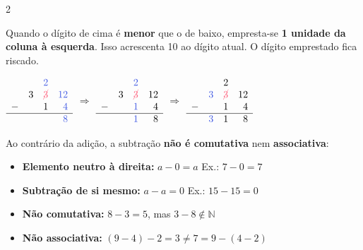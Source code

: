 \documentclass[12pt]{article}
\begin{document}
\begin{multicols}{2}

Quando o dígito de cima é \textbf{menor} que o de baixo, empresta-se \textbf{1 unidade da coluna à esquerda}.
Isso acrescenta 10 ao dígito atual. O dígito emprestado fica riscado.


\vspace{0.4cm}

$\begin{array}{rrrr}
&&\textcolor{iris}{2}&\\
&3&\textcolor{babypink}{\cancel{3}}&\textcolor{iris}{12}\\
-&&1&\textcolor{iris}{4}\\
\hline
&&&\textcolor{iris}{8}\\
\end{array}$
$\Rightarrow$
$\begin{array}{rrrr}
&&\textcolor{iris}{2}&\\
&3&\textcolor{babypink}{\cancel{3}}&12\\
-&&\textcolor{iris}{1}&4\\
\hline
&&\textcolor{iris}{1}&8\\
\end{array}$
$\Rightarrow$
$\begin{array}{rrrr}
&&2&\\
&\textcolor{iris}{3}&\textcolor{babypink}{\cancel{3}}&12\\
-&&1&4\\
\hline
&\textcolor{iris}{3}&1&8\\
\end{array}$


Ao contrário da adição, a subtração \textbf{não é comutativa} nem \textbf{associativa}:

\begin{itemize}
  \item \textbf{Elemento neutro à direita:} $a - 0 = a$ \quad Ex.: $7 - 0 = 7$
  \item \textbf{Subtração de si mesmo:} $a - a = 0$ \quad Ex.: $15 - 15 = 0$
  \item \textbf{Não comutativa:} $8 - 3 = 5$, mas $3 - 8 \notin \mathbb{N}$
  \item \textbf{Não associativa:} $(9-4)-2 = 3 \neq 7 = 9-(4-2)$
\end{itemize}


\end{multicols}
\end{document}
